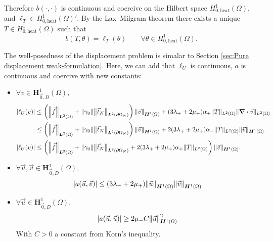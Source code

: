 \documentclass[a4paper,12pt,twoside]{report}
\begin{document}
Therefore $b(\cdot,\cdot)$ is continuous and coercive on the Hilbert space $H^1_{0,\text{heat}}(\Omega)$, and $\ell_T\in H^1_{0,\text{heat}}(\Omega)'$. By the Lax--Milgram theorem there exists a unique $T\in H^1_{0,\text{heat}}(\Omega)$ such that
\[
b(T,\theta)=\ell_T(\theta)\qquad\forall\theta\in H^1_{0,\text{heat}}(\Omega).
\]

The well-posedness of the displacement problem is simalar to Section \ref{sec:Pure displacement weak-formulation}. Here, we can add that $\ell_U$ is continuous, $a$ is continuous and coercive with new constants:
\begin{itemize}
	\item $\forall v \in \boldsymbol{H}^1_{\vec 0,D}(\Omega),$
	\begin{equation*}
	\begin{aligned}
	|\ell_U(v)| & \leq \left( \norm{\vec f}_{\boldsymbol L^2(\Omega)} + \norm{\gamma_0} \norm{\vec t_N}_{\boldsymbol L^2(\partial \Omega_N)}\right)\norm{\vec v}_{\boldsymbol H^1(\Omega)} + (3 \lambda_+ + 2 \mu_+) \alpha_+ \|T\|_{L^2(\Omega)} \|\div \vec v\|_{L^2(\Omega)} \\
	& \leq \left( \norm{\vec f}_{\boldsymbol L^2(\Omega)} + \norm{\gamma_0} \norm{\vec t_N}_{\boldsymbol L^2(\partial \Omega_N)}\right)\norm{\vec v}_{\boldsymbol H^1(\Omega)} + 2(3 \lambda_+ + 2 \mu_+) \alpha_+ \|T\|_{L^2(\Omega)} \|\vec v\|_{\boldsymbol H^1(\Omega)}. \\
	|\ell_U(v)| & \leq \left( \norm{\vec f}_{\boldsymbol L^2(\Omega)} + \norm{\gamma_0} \norm{\vec t_N}_{\boldsymbol L^2(\partial \Omega_N)} + 2(3 \lambda_+ + 2 \mu_+) \alpha_+ \|T\|_{L^2(\Omega)} \right) \|\vec v\|_{\boldsymbol H^1(\Omega)}.
	\end{aligned}
	\end{equation*}
	\item $\forall \vec u, \vec v \in \boldsymbol{H}^1_{\vec 0,D}(\Omega),$
	\begin{equation*}
		\left| a(\vec u, \vec v) \right| \leq (3\lambda_+ + 2\mu_+)\norm{\vec u}_{\boldsymbol H^1(\Omega)}\norm{\vec v}_{\boldsymbol H^1(\Omega)}
	\end{equation*}
	\item $\forall \vec u \in \boldsymbol{H}^1_{\vec 0,D}(\Omega),$
	\begin{equation*}
		\left| a(\vec u, \vec u) \right| \geq 2 \mu_- C \norm{\vec u}_{\boldsymbol{H}^1(\Omega)}^2
	\end{equation*}
	With $C > 0$ a constant from Korn's inequality.
\end{itemize}
\end{document}

